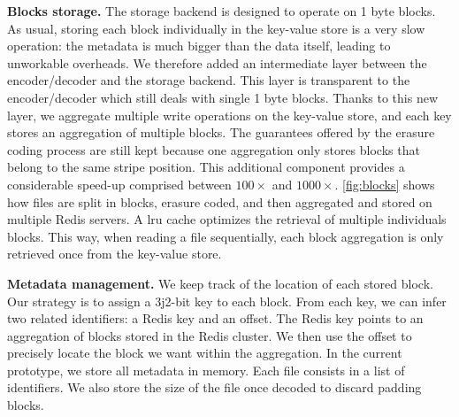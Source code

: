 \textbf{Blocks storage.} The storage backend is designed to operate on 1 byte blocks. 
As usual, storing each block individually in the key-value store is a very slow operation: the metadata is much bigger than the data itself, leading to unworkable overheads. 
We therefore added an intermediate layer between the encoder/decoder and the storage backend. 
This layer is transparent to the encoder/decoder which still deals with single 1 byte blocks. 
Thanks to this new layer, we aggregate multiple write operations on the key-value store, and each key stores an aggregation of multiple blocks.
The guarantees offered by the erasure coding process are still kept because one aggregation only stores blocks that belong to the same stripe position. 
This additional component provides a considerable speed-up comprised between $100\times$ and $1000\times$. 
\autoref{fig:blocks} shows how files are split in blocks, erasure coded, and then aggregated and stored on multiple Redis servers. %
A \ac{lru} cache optimizes the retrieval of multiple individuals blocks.
This way, when reading a file sequentially, each block aggregation is only retrieved once from the key-value store.

\textbf{Metadata management.} We keep track of the location of each stored block. 
Our strategy is to assign a 3j2-bit key to each block. 
From each key, we can infer two related identifiers: a Redis key and an offset. 
The Redis key points to an aggregation of blocks stored in the Redis cluster. 
We then use the offset to precisely locate the block we want within the aggregation.
In the current prototype, we store all metadata in memory. 
Each file consists in a list of identifiers. 
We also store the size of the file once decoded to discard padding blocks. 

